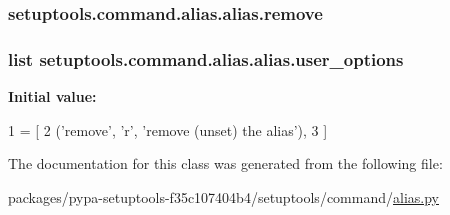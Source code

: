 \subsubsection[{remove}]{\setlength{\rightskip}{0pt plus 5cm}setuptools.\+command.\+alias.\+alias.\+remove}\label{classsetuptools_1_1command_1_1alias_1_1alias_a3de85705b6935c662ccecee8cc2b59d9}
\hypertarget{classsetuptools_1_1command_1_1alias_1_1alias_a5ccea17b6219cdcee3c21f60c81636c6}{}
\subsubsection[{user\+\_\+options}]{\setlength{\rightskip}{0pt plus 5cm}list setuptools.\+command.\+alias.\+alias.\+user\+\_\+options\hspace{0.3cm}{\ttfamily [static]}}\label{classsetuptools_1_1command_1_1alias_1_1alias_a5ccea17b6219cdcee3c21f60c81636c6}
{\bfseries Initial value\+:}
\begin{DoxyCode}
1 = [
2         (\textcolor{stringliteral}{'remove'}, \textcolor{stringliteral}{'}\textcolor{stringliteral}{r', '}remove (unset) the alias'),
3     ]
\end{DoxyCode}


The documentation for this class was generated from the following file\+:\begin{DoxyCompactItemize}
\item 
packages/pypa-\/setuptools-\/f35c107404b4/setuptools/command/\hyperlink{alias_8py}{alias.\+py}\end{DoxyCompactItemize}
